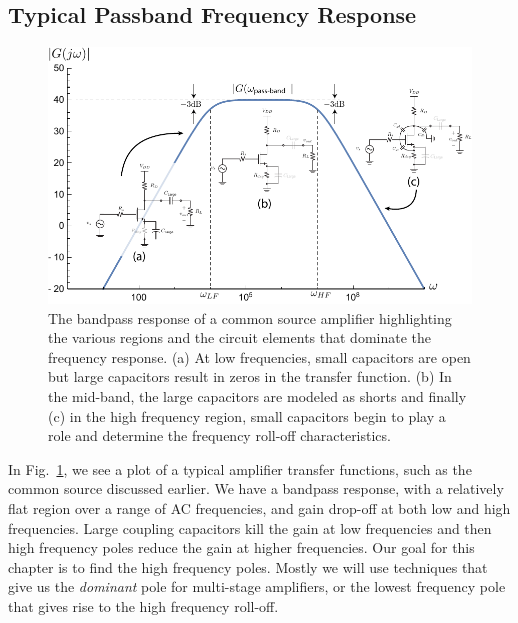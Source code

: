 \subsection{Typical Passband Frequency Response}
\begin{figure}[tb]
\centering
\includegraphics[width=.95\columnwidth]{amp_bandpass_decorate} 
\caption{The bandpass response of a common source amplifier highlighting the various regions and the circuit elements that dominate the frequency response.  (a) At low frequencies, small capacitors are open but large capacitors result in zeros in the transfer function.  (b) In the mid-band, the large capacitors are modeled as shorts and finally (c) in the high frequency region, small capacitors begin to play a role and determine the frequency roll-off characteristics.}
\label{fig:amp_bandpass}
\end{figure}
In Fig.~\ref{fig:amp_bandpass}, we see a plot of a typical amplifier transfer functions, such as the common source discussed earlier.  We have a bandpass response, with a relatively flat region over a range of AC frequencies, and gain drop-off at both low and high frequencies.  Large coupling capacitors kill the gain at low frequencies and then high frequency poles reduce the gain at higher frequencies. Our goal for this chapter is to find the high frequency poles.  Mostly we will use techniques that give us the \emph{dominant} pole for multi-stage amplifiers, or the lowest frequency pole that gives rise to the high frequency roll-off.
